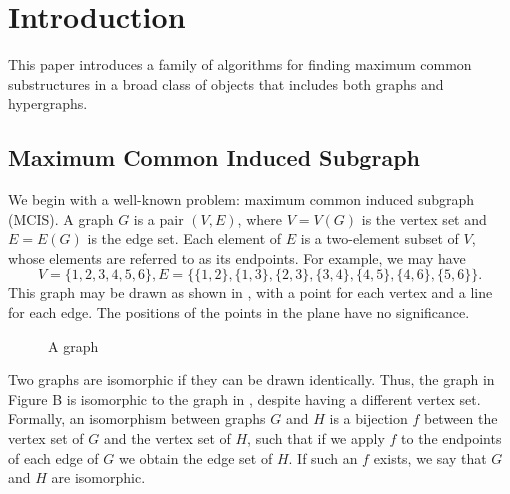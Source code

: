 \chapter{Introduction}
\label{c:intro}


This paper introduces a family of algorithms for finding maximum common
substructures in a broad class of objects that includes both graphs and
hypergraphs.

\section{Maximum Common Induced Subgraph}

We begin with a well-known problem: maximum common induced subgraph (MCIS). A
graph $G$ is a pair $(V, E)$, where $V = V(G)$ is the vertex set and $E = E(G)$
is the edge set. Each element of $E$ is a two-element subset of $V$, whose
elements are referred to as its endpoints. For example, we may have
\[
V = \{1, 2, 3, 4, 5, 6\},
E = \{\{1,2\}, \{1,3\}, \{2,3\}, \{3,4\}, \{4,5\}, \{4,6\}, \{5,6\}\}
.
\]
This graph may be drawn as shown in , with a point for each
vertex and a line for each edge.  The positions of the points in the plane have
no significance.

\begin{figure}[h!]
\centering
{}
\caption{A graph}
\label{fig:introA}
\end{figure}

Two graphs are isomorphic if they can be drawn identically. Thus, the graph in
Figure B is isomorphic to the graph in , despite having a different
vertex set. Formally, an isomorphism between graphs $G$ and $H$ is a bijection $f$
between the vertex set of $G$ and the vertex set of $H$, such that if we apply $f$ to
the endpoints of each edge of $G$ we obtain the edge set of $H$. If such an $f$
exists, we say that $G$ and $H$ are isomorphic.

